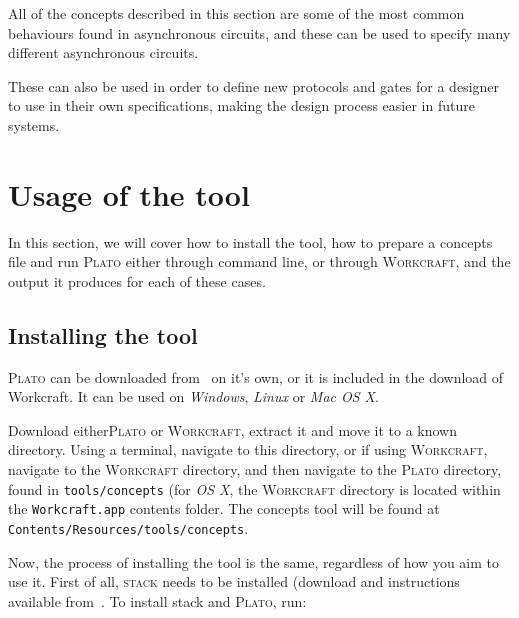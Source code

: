 \documentclass[british,conference,compsoc]{IEEEtran}
\newcommand{\noun}[1]{\textsc{#1}}
\begin{document}
\noindent All of the concepts described in this section are some of the most
common behaviours found in asynchronous circuits, and these can be used
to specify many different asynchronous circuits. 

These can also be used in order to define new protocols and gates for a designer
to use in their own specifications, making the design process easier in future 
systems. 

\vspace{-3mm}

\section{Usage of the tool\label{sec:tool-use}}

\vspace{-2mm}

In this section, we will cover how to install the tool, how to prepare a
concepts file and run \noun{Plato} either through command line, or through 
\noun{Workcraft}, and the output it produces for each of these cases.

\vspace{-2mm}

\subsection{Installing the tool \label{sub:installing}}

\vspace{-2mm}

\noun{Plato} can be downloaded from~\cite{2016_concepts_github} on it's
own, or it is included in the download of Workcraft. It can be used on 
\emph{Windows}, \emph{Linux} or \emph{Mac OS X}.

Download either\noun{Plato} or \noun{Workcraft}, extract it and move it to
a known directory. Using a terminal, navigate to this directory,
or if using \noun{Workcraft}, navigate to the \noun{Workcraft} directory, and
then navigate to the \noun{Plato} directory, found in \texttt{tools/concepts} 
(for \emph{OS X}, the \noun{Workcraft} directory is located within the 
\texttt{Workcraft.app} contents folder. The concepts tool will be found at 
\texttt{Contents/Resources/tools/concepts}.

Now, the process of installing the tool is the same, regardless of how you aim 
to use it. First of all, \noun{stack} needs to be installed 
(download and instructions available from~\cite{stack_website}. 
To install stack and \noun{Plato}, run: 
\end{document}
